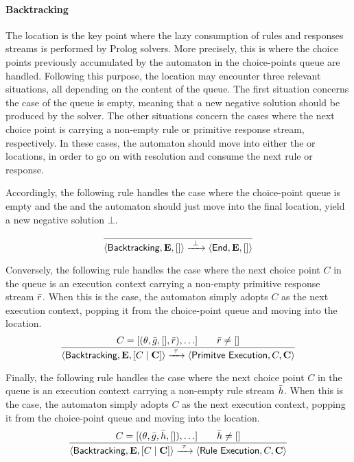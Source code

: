 \documentclass[12pt,a4paper,openright,twoside]{book}
\begin{document}
\paragraph{Backtracking}

The  location is the key point where the lazy consumption of rules and responses streams is performed by Prolog solvers.
%
More precisely, this is where the choice points previously accumulated by the automaton in the choice-points queue are handled.
%
Following this purpose, the  location may encounter three relevant situations, all depending on the content of the queue.
%
The first situation concerns the case of the queue is empty, meaning that a new negative solution should be produced by the solver.
%
The other situations concern the cases where the next choice point is carrying a non-empty rule or primitive response stream, respectively.
%
In these cases, the automaton should move into either the  or  locations, in order to go on with resolution and consume the next rule or response.

Accordingly, the following rule handles the case where the choice-point queue is empty and the and the automaton should just move into the  final location, yield a new negative solution $\bot$.
%
\[
\frac{
}{
    \langle \textsf{Backtracking}, \mathbf{E}, [] \rangle
    \xrightarrow{\ \bot\ }
    \langle \textsf{End}, \mathbf{E}, [] \rangle
}
\]

Conversely, the following rule handles the case where the next choice point $C$ in the queue is an execution context carrying a non-empty primitive response stream $\bar{r}$.
%
When this is the case, the automaton simply adopts $C$ as the next execution context, popping it from the choice-point queue and moving into the  location.
%
\[
\frac{
    C = [(\theta, \bar{g}, [], \bar{r}), \ldots]
    \qquad
    \bar{r} \neq []
}{
    \langle \textsf{Backtracking}, \mathbf{E}, [C \mid \mathbf{C}] \rangle
    \xrightarrow{\ \tau\ }
    \langle \textsf{Primitve Execution}, C, \mathbf{C} \rangle
}
\]

Finally, the following rule handles the case where the next choice point $C$ in the queue is an execution context carrying a non-empty rule stream $\bar{h}$.
%
When this is the case, the automaton simply adopts $C$ as the next execution context, popping it from the choice-point queue and moving into the  location.
%
\[
\frac{
    C = [(\theta, \bar{g}, \bar{h}, []), \ldots]
    \qquad
    \bar{h} \neq []
}{
    \langle \textsf{Backtracking}, \mathbf{E}, [C \mid \mathbf{C}] \rangle
    \xrightarrow{\ \tau\ }
    \langle \textsf{Rule Execution}, C, \mathbf{C} \rangle
}
\]
\end{document}
